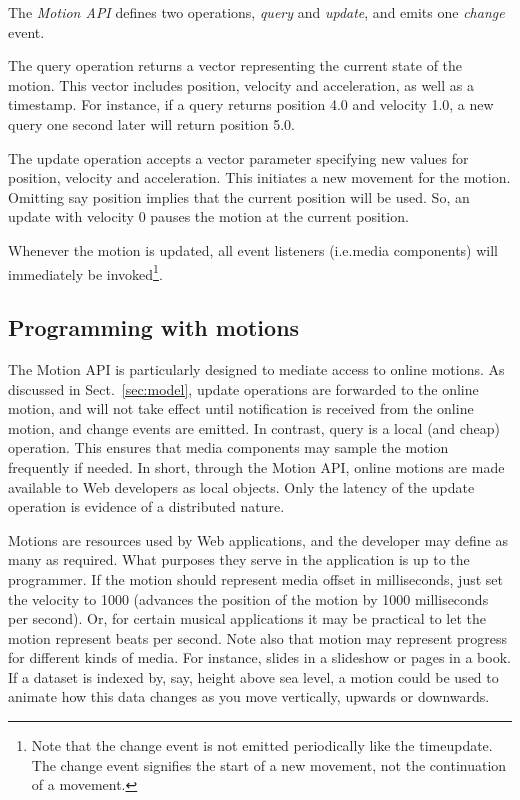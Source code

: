 The \emph{Motion API} defines two operations, \emph{query} and \emph{update},
and emits one \emph{change} event.


The query operation returns a vector representing the current state of the
motion. This vector includes position, velocity and acceleration, as well as a
timestamp. For instance, if a query returns position 4.0 and velocity 1.0, a
new query one second later will return position 5.0.


The update operation accepts a vector parameter specifying new values for
position, velocity and acceleration. This initiates a new movement for the
motion. Omitting say position implies that the current position will be used.
So, an update with velocity 0 pauses the motion at the current position.


Whenever the motion is updated, all event listeners (i.e.media components)
will immediately be invoked\footnote{Note that the change event is not emitted
periodically like the timeupdate. The change event signifies the start of a
new movement, not the continuation of a movement.}.


\subsection{Programming with motions}


The Motion API is particularly designed to mediate access to online motions.
As discussed in Sect.~\ref{sec:model}, update operations are forwarded to the
online motion, and will not take effect until notification is received from
the online motion, and change events are emitted. In contrast, query is a local
(and cheap) operation. This ensures that media components may sample the
motion frequently if needed. In short, through the Motion API, online motions
are made available to Web developers as local objects. Only the latency of the
update operation is evidence of a distributed nature.


Motions are resources used by Web applications, and the developer may define
as many as required. What purposes they serve in the application is up to the
programmer. If the motion should represent media offset in milliseconds, just
set the velocity to 1000 (advances the position of the motion by 1000
milliseconds per second). Or, for certain musical applications it may be
practical to let the motion represent beats per second. Note also that motion
may represent progress for different kinds of media. For instance, slides in a
slideshow or pages in a book. If a dataset is indexed by, say, height above
sea level, a motion could be used to animate how this data changes as you move
vertically, upwards or downwards.

